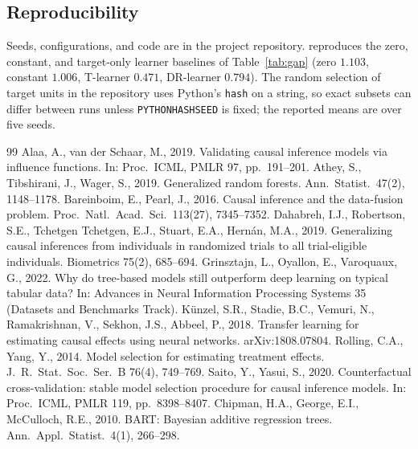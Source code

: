\documentclass[pdflatex,sn-mathphys-num]{sn-jnl}
\begin{document}
\begin{appendices}
\section*{Reproducibility}
Seeds, configurations, and code are in the project repository.  reproduces the zero, constant, and target-only learner baselines of Table~\ref{tab:gap} (zero $1.103$, constant $1.006$, T-learner $0.471$, DR-learner $0.794$). The random selection of target units in the repository uses Python's \texttt{hash} on a string, so exact subsets can differ between runs unless \texttt{PYTHONHASHSEED} is fixed; the reported means are over five seeds.
\end{appendices}

\begin{thebibliography}{99}
 Alaa, A., van der Schaar, M., 2019. Validating causal inference models via influence functions. In: Proc.\ ICML, PMLR 97, pp.\ 191--201.
 Athey, S., Tibshirani, J., Wager, S., 2019. Generalized random forests. Ann.\ Statist.\ 47(2), 1148--1178.
 Bareinboim, E., Pearl, J., 2016. Causal inference and the data-fusion problem. Proc.\ Natl.\ Acad.\ Sci.\ 113(27), 7345--7352.
 Dahabreh, I.J., Robertson, S.E., Tchetgen Tchetgen, E.J., Stuart, E.A., Hern\'an, M.A., 2019. Generalizing causal inferences from individuals in randomized trials to all trial-eligible individuals. Biometrics 75(2), 685--694.
 Grinsztajn, L., Oyallon, E., Varoquaux, G., 2022. Why do tree-based models still outperform deep learning on typical tabular data? In: Advances in Neural Information Processing Systems 35 (Datasets and Benchmarks Track).
 K\"unzel, S.R., Stadie, B.C., Vemuri, N., Ramakrishnan, V., Sekhon, J.S., Abbeel, P., 2018. Transfer learning for estimating causal effects using neural networks. arXiv:1808.07804.
 Rolling, C.A., Yang, Y., 2014. Model selection for estimating treatment effects. J.\ R.\ Stat.\ Soc.\ Ser.\ B 76(4), 749--769.
 Saito, Y., Yasui, S., 2020. Counterfactual cross-validation: stable model selection procedure for causal inference models. In: Proc.\ ICML, PMLR 119, pp.\ 8398--8407.
 Chipman, H.A., George, E.I., McCulloch, R.E., 2010. BART: Bayesian additive regression trees. Ann.\ Appl.\ Statist.\ 4(1), 266--298.

\end{thebibliography}
\end{document}
